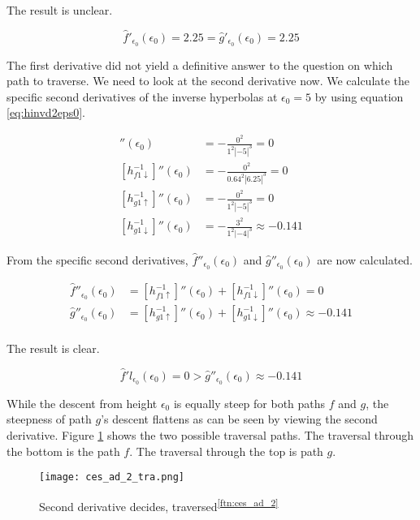 The result is unclear.

$$\hat{f}'_{\epsilon_0}(\epsilon_0) = 2.25 = \hat{g}'_{\epsilon_0}(\epsilon_0) = 2.25$$

The first derivative did not yield a definitive answer to the question on which path to traverse. We need to look at the second derivative now. We calculate the specific second derivatives of the inverse hyperbolas at $\epsilon_0 = 5$ by using equation \ref{eq:hinvd2eps0}.

\begin{align*}
	[h_{f1\uparrow}^{-1}]''(\epsilon_0) &= -\frac{0^2}{1^2 \left| -5 \right|^3} = 0\\
	[h_{f1\downarrow}^{-1}]''(\epsilon_0) &= -\frac{0^2}{0.64^2 \left| 6.25 \right|^3} = 0\\
	[h_{g1\uparrow}^{-1}]''(\epsilon_0) &= -\frac{0^2}{1^2 \left| -5 \right|^3} = 0\\
	[h_{g1\downarrow}^{-1}]''(\epsilon_0) &= -\frac{3^2}{1^2 \left| -4 \right|^3} \approx -0.141 
\end{align*}

From the specific second derivatives, $\hat{f}''_{\epsilon_0}(\epsilon_0)$ and $\hat{g}''_{\epsilon_0}(\epsilon_0)$ are now calculated.

\begin{align*}
	\hat{f}''_{\epsilon_0}(\epsilon_0) &= [h_{f1\uparrow}^{-1}]''(\epsilon_0) + [h_{f1\downarrow}^{-1}]''(\epsilon_0) = 0\\
	\hat{g}''_{\epsilon_0}(\epsilon_0) &= [h_{g1\uparrow}^{-1}]''(\epsilon_0) + [h_{g1\downarrow}^{-1}]''(\epsilon_0) \approx -0.141\\
\end{align*}

The result is clear.

$$\hat{f}'l_{\epsilon_0}(\epsilon_0) = 0 > \hat{g}''_{\epsilon_0}(\epsilon_0) \approx -0.141$$

While the descent from height $\epsilon_0$ is equally steep for both paths $f$ and $g$, the steepness of path $g$'s descent flattens as can be seen by viewing the second derivative. Figure \ref{fig:ces_ad_2_tra} shows the two possible traversal paths. The traversal through the bottom is the path $f$. The traversal through the top is path $g$.

\begin{figure}[H]
	\centering
    
    \texttt{[image: ces\_ad\_2\_tra.png]}
		
	\caption{Second derivative decides, traversed\textsuperscript{\ref{ftn:ces_ad_2}}}
    \label{fig:ces_ad_2_tra}
\end{figure}
	
